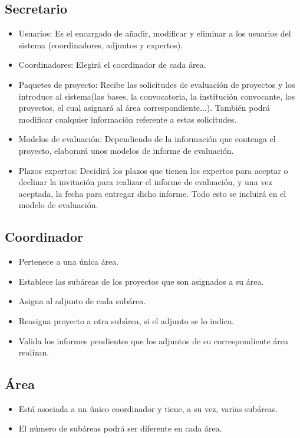 \documentclass[12pt,a4paper,spanish,twoside]{book}
\begin{document}
\subsection{Secretario}
\begin{itemize}
\item Usuarios: Es el encargado de añadir, modificar y eliminar a los
  usuarios del sistema (coordinadores, adjuntos y expertos).
\item Coordinadores: Elegirá el coordinador de cada área.
\item Paquetes de proyecto: Recibe las solicitudes de evaluación de proyectos
  y los introduce al sistema(las bases, la convocatoria, la institución
  convocante, los proyectos, el cual asignará al área correspondiente...). 
  También podrá modificar cualquier información referente a estas
  solicitudes. 
\item Modelos de evaluación: Dependiendo de la información que contenga el
  proyecto, elaborará unos modelos de informe de evaluación. 
\item Plazos expertos: Decidirá los plazos que tienen los expertos para
  aceptar o declinar la invitación para realizar el informe de evaluación,
  y una vez aceptada, la fecha para entregar dicho informe. Todo esto
  se incluirá en el modelo de evaluación.
\end{itemize}

\subsection{Coordinador}
\begin{itemize}
\item Pertenece a una única área.
\item Establece las subáreas de los proyectos que son asignados a su área.
\item Asigna al adjunto de cada subárea.
\item Reasigna proyecto a otra subárea, si el adjunto se lo indica.
\item Valida los informes pendientes que los adjuntos de su correspondiente 
  área realizan.
\end{itemize}

\subsection{Área}
\begin{itemize}
\item Está asociada a un único coordinador y tiene, a su vez, varias subáreas. 
\item El número de subáreas podrá ser diferente en cada área.
\end{itemize}
\end{document}
